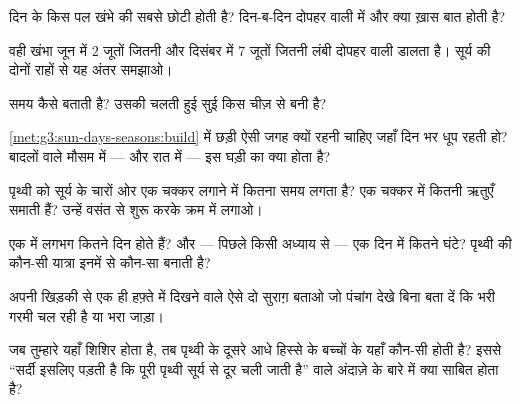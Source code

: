 \begin{exercise}[$\star$]\label{exo:g3:sun-days-seasons:2}
दिन के किस पल खंभे की  सबसे छोटी होती है? दिन-ब-दिन दोपहर वाली
 में और क्या ख़ास बात होती है?
\end{exercise}

\begin{exercise}[$\star$]\label{exo:g3:sun-days-seasons:3}
वही खंभा जून में $2$ जूतों जितनी और दिसंबर में $7$ जूतों जितनी लंबी
दोपहर वाली  डालता है। सूर्य की दोनों राहों से यह अंतर समझाओ।
\end{exercise}

\begin{exercise}[$\star$]\label{exo:g3:sun-days-seasons:4}
 समय कैसे बताती है? उसकी चलती हुई सुई किस चीज़ से बनी है?
\end{exercise}

\begin{exercise}[$\star$]\label{exo:g3:sun-days-seasons:5}
\cref{met:g3:sun-days-seasons:build} में छड़ी ऐसी जगह क्यों रहनी
चाहिए जहाँ दिन भर धूप रहती हो? बादलों वाले मौसम में --- और रात में
--- इस घड़ी का क्या होता है?
\end{exercise}

\begin{exercise}[$\star$]\label{exo:g3:sun-days-seasons:6}
पृथ्वी को सूर्य के चारों ओर एक चक्कर लगाने में कितना समय लगता है? एक
चक्कर में कितनी ऋतुएँ समाती हैं? उन्हें वसंत से शुरू करके क्रम में
लगाओ।
\end{exercise}

\begin{exercise}[$\star$]\label{exo:g3:sun-days-seasons:7}
एक  में लगभग कितने दिन होते हैं? और --- पिछले किसी अध्याय से ---
एक दिन में कितने घंटे? पृथ्वी की कौन-सी यात्रा इनमें से कौन-सा बनाती
है?
\end{exercise}

\begin{exercise}[$\star$]\label{exo:g3:sun-days-seasons:8}
अपनी खिड़की से एक ही हफ़्ते में दिखने वाले ऐसे दो सुराग़ बताओ जो
पंचांग देखे बिना बता दें कि भरी गरमी चल रही है या भरा जाड़ा।
\end{exercise}

\begin{exercise}[$\star$]\label{exo:g3:sun-days-seasons:9}
जब तुम्हारे यहाँ शिशिर होता है, तब पृथ्वी के दूसरे आधे हिस्से के
बच्चों के यहाँ कौन-सी  होती है? इससे ``सर्दी इसलिए पड़ती है कि
पूरी पृथ्वी सूर्य से दूर चली जाती है'' वाले अंदाज़े के बारे में क्या
साबित होता है?
\end{exercise}


